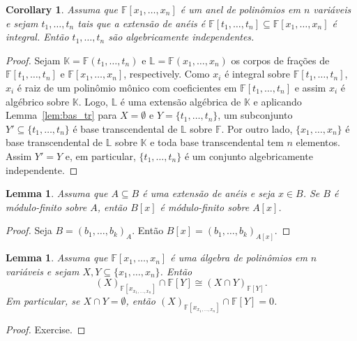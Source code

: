 \documentclass[12pt]{amsart}
\newcommand{\F}{\mathbb F}
\renewcommand{\L}{\mathbb L}
\newcommand{\K}{\mathbb K}
\newtheorem{corollary}{Corollary}[theorem]
\newtheorem{lemma}[theorem]{Lemma}
\begin{document}
\begin{corollary}\label{cor:pols}
    Assuma que $\F[x_1,\ldots,x_n]$ é um anel de polinômios em $n$ variáveis e sejam $t_1,\ldots,t_n$ tais que 
    a extensão de anéis é $\F[t_1,\ldots,t_n]\subseteq \F[x_1,\ldots,x_n]$ é integral. Então $t_1,\ldots,t_n$ 
    são algebricamente independentes. 
\end{corollary}
\begin{proof}
    Sejam $\K=\F(t_1,\ldots,t_n)$ e $\L=\F(x_1,\ldots,x_n)$ os corpos de frações de $\F[t_1,\ldots,t_n]$ e $\F[x_1,\ldots,x_n]$, respectively. Como $x_i$ é integral sobre $\F[t_1,\ldots,t_n]$, $x_i$ 
    é raiz de um polinômio mônico com coeficientes em  $\F[t_1,\ldots,t_n]$ e assim $x_i$ é algébrico 
    sobre $\K$. Logo, $\L$ é uma extensão algébrica de $\K$ e aplicando Lemma~\ref{lem:bas_tr} para $X=\emptyset$ e 
    $Y=\{t_1,\ldots,t_n\}$, um subconjunto $Y'\subseteq \{t_1,\ldots,t_n\}$ é base transcendental de $\L$ sobre $\F$. 
    Por outro lado, $\{x_1,\ldots,x_n\}$ é base transcendental de $\L$ sobre $\K$ e toda base transcendental tem $n$ elementos. Assim $Y'=Y$ e, em particular, $\{t_1,\ldots,t_n\}$
    é um conjunto algebricamente independente. 
\end{proof}

\begin{lemma}\label{lem:modfin}
    Assuma que $A\subseteq B$ é uma extensão de anéis e seja $x\in B$. Se $B$ é módulo-finito sobre $A$, 
    então $B[x]$ é módulo-finito sobre $A[x]$.
\end{lemma}
\begin{proof}
    Seja $B=(b_1,\ldots,b_k)_A$. Então $B[x]=(b_1,\ldots,b_k)_{A[x]}$. 
\end{proof}

\begin{lemma}\label{lem:polvars}
    Assuma que $\F[x_1,\ldots,x_n]$ é uma álgebra de polinômios em $n$ variáveis e sejam  
    $X,Y\subseteq \{x_1,\ldots,x_n\}$. 
    Então 
    \[
        (X)_{\F[x_{x_1,\ldots,x_n}]}\cap \F[Y]\cong 
        (X\cap Y)_{ \F[Y]}.
    \]
Em particular, se $X\cap Y=\emptyset$, então $(X)_{\F[x_{x_1,\ldots,x_n}]}\cap \F[Y]=0$. 
\end{lemma}
\begin{proof}
Exercise. 
\end{proof}
\end{document}
